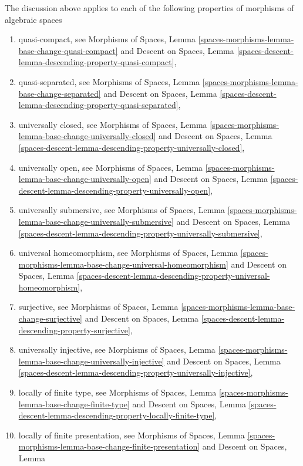 \medskip\noindent
The discussion above applies to each of the following properties of
morphisms of algebraic spaces
\begin{enumerate}
\item quasi-compact, see
Morphisms of Spaces,
Lemma \ref{spaces-morphisms-lemma-base-change-quasi-compact}
and
Descent on Spaces,
Lemma \ref{spaces-descent-lemma-descending-property-quasi-compact},
\item quasi-separated, see
Morphisms of Spaces,
Lemma \ref{spaces-morphisms-lemma-base-change-separated}
and
Descent on Spaces,
Lemma \ref{spaces-descent-lemma-descending-property-quasi-separated},
\item universally closed, see
Morphisms of Spaces,
Lemma \ref{spaces-morphisms-lemma-base-change-universally-closed}
and
Descent on Spaces,
Lemma \ref{spaces-descent-lemma-descending-property-universally-closed},
\item universally open, see
Morphisms of Spaces,
Lemma \ref{spaces-morphisms-lemma-base-change-universally-open}
and
Descent on Spaces,
Lemma \ref{spaces-descent-lemma-descending-property-universally-open},
\item universally submersive, see
Morphisms of Spaces,
Lemma \ref{spaces-morphisms-lemma-base-change-universally-submersive}
and
Descent on Spaces,
Lemma \ref{spaces-descent-lemma-descending-property-universally-submersive},
\item universal homeomorphism, see
Morphisms of Spaces,
Lemma \ref{spaces-morphisms-lemma-base-change-universal-homeomorphism}
and
Descent on Spaces,
Lemma \ref{spaces-descent-lemma-descending-property-universal-homeomorphism},
\item surjective, see
Morphisms of Spaces,
Lemma \ref{spaces-morphisms-lemma-base-change-surjective}
and
Descent on Spaces,
Lemma \ref{spaces-descent-lemma-descending-property-surjective},
\item universally injective, see
Morphisms of Spaces,
Lemma \ref{spaces-morphisms-lemma-base-change-universally-injective}
and
Descent on Spaces,
Lemma \ref{spaces-descent-lemma-descending-property-universally-injective},
\item locally of finite type, see
Morphisms of Spaces,
Lemma \ref{spaces-morphisms-lemma-base-change-finite-type}
and
Descent on Spaces,
Lemma \ref{spaces-descent-lemma-descending-property-locally-finite-type},
\item locally of finite presentation, see
Morphisms of Spaces,
Lemma \ref{spaces-morphisms-lemma-base-change-finite-presentation}
and
Descent on Spaces, Lemma

\end{enumerate}
